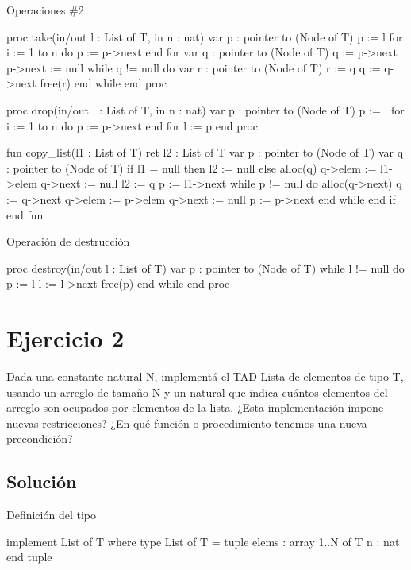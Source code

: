 \begin{codebox}{Operaciones \#2}
\begin{pascallike}
proc take(in/out l : List of T, in n : nat)
    var p : pointer to (Node of T)
    p := l
    for i := 1 to n do
        p := p->next
    end for
    var q : pointer to (Node of T)
    q := p->next
    p->next := null
    while q != null do
        var r : pointer to (Node of T)
        r := q
        q := q->next
        free(r)
    end while
end proc

proc drop(in/out l : List of T, in n : nat)
    var p : pointer to (Node of T)
    p := l
    for i := 1 to n do
        p := p->next
    end for
    l := p
end proc

fun copy_list(l1 : List of T) ret l2 : List of T
    var p : pointer to (Node of T)
    var q : pointer to (Node of T)
    if l1 = null then
        l2 := null
    else
        alloc(q)
        q->elem := l1->elem
        q->next := null
        l2 := q
        p := l1->next
        while p != null do
            alloc(q->next)
            q := q->next
            q->elem := p->elem
            q->next := null
            p := p->next
        end while
    end if
end fun
\end{pascallike}
\end{codebox}

\begin{codebox}{Operación de destrucción}
\begin{pascallike}
proc destroy(in/out l : List of T)
    var p : pointer to (Node of T)
    while l != null do
        p := l
        l := l->next
        free(p)
    end while
end proc
\end{pascallike}
\end{codebox}

\section{Ejercicio 2}
Dada una constante natural N, implementá el TAD Lista de elementos de tipo T, usando un arreglo de tamaño N y un natural que indica cuántos elementos del arreglo son ocupados por elementos de la lista. ¿Esta implementación impone nuevas restricciones? ¿En qué función o procedimiento tenemos una nueva precondición?

\subsection{Solución}
\begin{codebox}{Definición del tipo}
\begin{pascallike}
implement List of T where
type List of T = tuple
                   elems : array 1..N of T
                   n : nat
                 end tuple
\end{pascallike}
\end{codebox}

